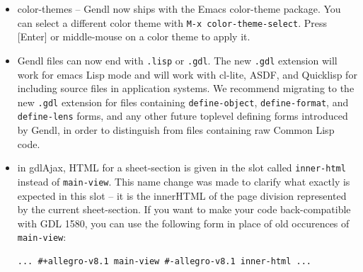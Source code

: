 \documentclass [11pt]{book}
\begin{document}
\begin{itemize}
\item color-themes -- Gendl now ships with the Emacs
       color-theme package. You can select a different color theme with \texttt{M-x color-theme-select}. Press [Enter] or middle-mouse on a color theme to apply it.

\item Gendl files can now end with \texttt{.lisp} or \texttt{.gdl}. The new \texttt{.gdl} extension will work for emacs Lisp mode and will work with
	 cl-lite, ASDF, and Quicklisp for including source files in application systems. We recommend migrating
to the new \texttt{.gdl} extension for files containing \texttt{define-object}, \texttt{define-format}, and \texttt{define-lens} forms, and any other future toplevel defining forms introduced by Gendl, in order to distinguish 
from files containing raw Common Lisp code.

\item in gdlAjax, HTML for a sheet-section is given in the slot called \texttt{inner-html} instead of \texttt{main-view}. This name change was made to clarify what exactly is
	 expected in this slot -- it is the innerHTML of the page
	 division represented by the current sheet-section. If you
	 want to make your code back-compatible with GDL 1580, you can
	 use the following form in place of old occurences of \texttt{main-view}: 

\begin{verbatim}... #+allegro-v8.1 main-view #-allegro-v8.1 inner-html ...
\end{verbatim}

\end{itemize}



\backmatter



\printindex
\end{document}
